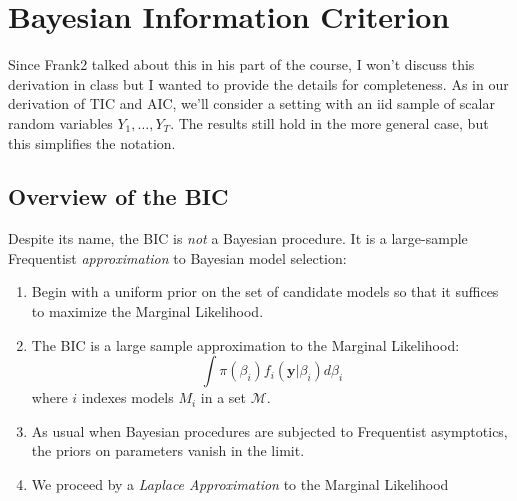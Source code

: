 \documentclass[12pt]{article}
\theoremstyle{definition}
\begin{document}


 


\section{Bayesian Information Criterion}
Since Frank2 talked about this in his part of the course, I won't discuss this derivation in class but I wanted to provide the details for completeness. As in our derivation of TIC and AIC, we'll consider a setting with an iid sample of scalar random variables $Y_1, \hdots, Y_T$. The results still hold in the more general case, but this simplifies the notation. 

\subsection{Overview of the BIC}
Despite its name, the BIC is \emph{not} a Bayesian procedure. It is a large-sample Frequentist \emph{approximation} to Bayesian model selection:
	\begin{enumerate}
		\item Begin with a uniform prior on the set of candidate models so that it suffices to maximize the Marginal Likelihood.
		\item The BIC is a large sample approximation to the Marginal Likelihood:
		$$\int \pi(\beta_i)f_i(\mathbf{y}|\beta_i)d\beta_i$$
		where $i$ indexes models $M_i$ in a set $\mathcal{M}$.
		\item As usual when Bayesian procedures are subjected to Frequentist asymptotics, the priors on parameters vanish in the limit.
		\item We proceed by a \emph{Laplace Approximation} to the Marginal Likelihood
	\end{enumerate}
\end{document}
